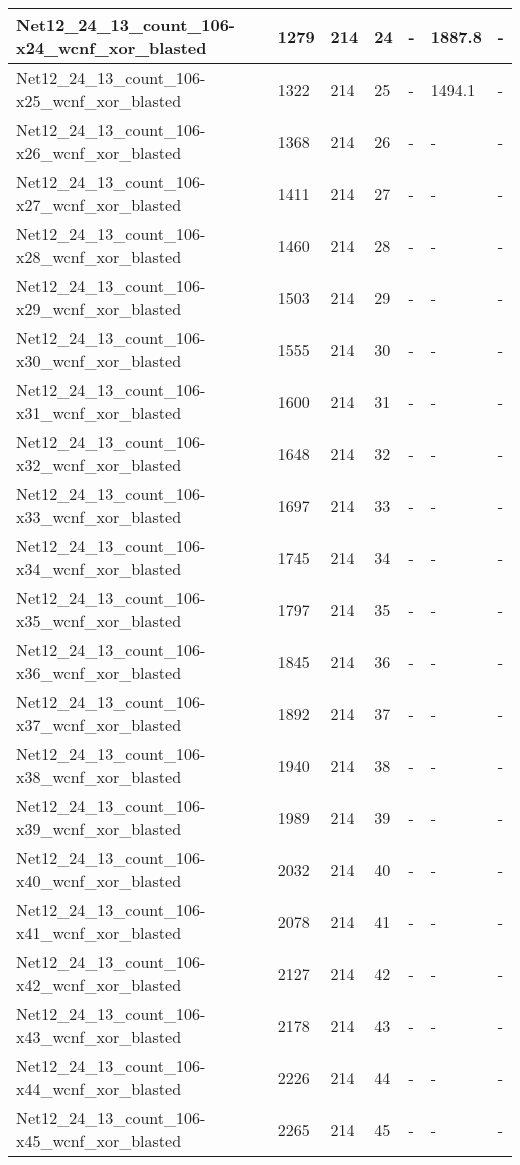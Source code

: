 \begin{scriptsize}
\begin{longtable}{|p{5cm}|l|l|l|l|l|l|}
Net12\_24\_13\_count\_106-x24\_wcnf\_xor\_blasted&1279&214&24&-&1887.8&- \\ \hline 
Net12\_24\_13\_count\_106-x25\_wcnf\_xor\_blasted&1322&214&25&-&1494.1&- \\ \hline 
Net12\_24\_13\_count\_106-x26\_wcnf\_xor\_blasted&1368&214&26&-&-&- \\ \hline 
Net12\_24\_13\_count\_106-x27\_wcnf\_xor\_blasted&1411&214&27&-&-&- \\ \hline 
Net12\_24\_13\_count\_106-x28\_wcnf\_xor\_blasted&1460&214&28&-&-&- \\ \hline 
Net12\_24\_13\_count\_106-x29\_wcnf\_xor\_blasted&1503&214&29&-&-&- \\ \hline 
Net12\_24\_13\_count\_106-x30\_wcnf\_xor\_blasted&1555&214&30&-&-&- \\ \hline 
Net12\_24\_13\_count\_106-x31\_wcnf\_xor\_blasted&1600&214&31&-&-&- \\ \hline 
Net12\_24\_13\_count\_106-x32\_wcnf\_xor\_blasted&1648&214&32&-&-&- \\ \hline 
Net12\_24\_13\_count\_106-x33\_wcnf\_xor\_blasted&1697&214&33&-&-&- \\ \hline 
Net12\_24\_13\_count\_106-x34\_wcnf\_xor\_blasted&1745&214&34&-&-&- \\ \hline 
Net12\_24\_13\_count\_106-x35\_wcnf\_xor\_blasted&1797&214&35&-&-&- \\ \hline 
Net12\_24\_13\_count\_106-x36\_wcnf\_xor\_blasted&1845&214&36&-&-&- \\ \hline 
Net12\_24\_13\_count\_106-x37\_wcnf\_xor\_blasted&1892&214&37&-&-&- \\ \hline 
Net12\_24\_13\_count\_106-x38\_wcnf\_xor\_blasted&1940&214&38&-&-&- \\ \hline 
Net12\_24\_13\_count\_106-x39\_wcnf\_xor\_blasted&1989&214&39&-&-&- \\ \hline 
Net12\_24\_13\_count\_106-x40\_wcnf\_xor\_blasted&2032&214&40&-&-&- \\ \hline 
Net12\_24\_13\_count\_106-x41\_wcnf\_xor\_blasted&2078&214&41&-&-&- \\ \hline 
Net12\_24\_13\_count\_106-x42\_wcnf\_xor\_blasted&2127&214&42&-&-&- \\ \hline 
Net12\_24\_13\_count\_106-x43\_wcnf\_xor\_blasted&2178&214&43&-&-&- \\ \hline 
Net12\_24\_13\_count\_106-x44\_wcnf\_xor\_blasted&2226&214&44&-&-&- \\ \hline 
Net12\_24\_13\_count\_106-x45\_wcnf\_xor\_blasted&2265&214&45&-&-&- \\ \hline 

\end{longtable}
\end{scriptsize}
